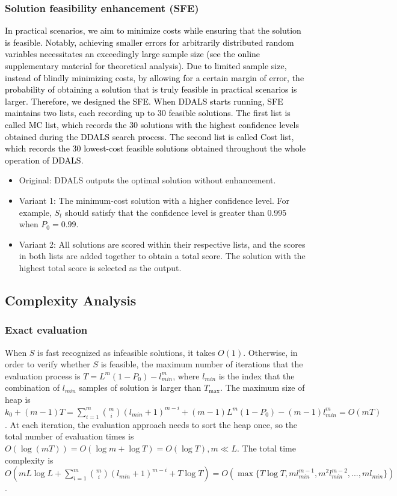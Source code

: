 \documentclass[lettersize,journal]{IEEEtran}
\begin{document}
\subsubsection{Solution feasibility enhancement (SFE)}
\textcolor{black}{
In practical scenarios, we aim to minimize costs while ensuring that the solution is feasible.
Notably, achieving smaller errors for arbitrarily distributed random variables necessitates an exceedingly large sample size (see the online supplementary material for theoretical analysis).
Due to limited sample size, instead of blindly minimizing costs, by allowing for a certain margin of error, the probability of obtaining a solution that is truly feasible in practical scenarios is larger. 
Therefore, we designed the SFE.
When DDALS starts running, SFE maintains two lists, each recording up to 30 feasible solutions.
The first list is called MC list, which records the 30 solutions with the highest confidence levels obtained during the DDALS search process. 
The second list is called Cost list, which records the 30 lowest-cost feasible solutions obtained throughout the whole operation of DDALS.
}
\begin{itemize}
    \item Original: DDALS outputs the optimal solution without enhancement. 
    \item Variant 1: The minimum-cost solution with a higher confidence level. For example, $S_t$ should satisfy that the confidence level is greater than 0.995 when $P_0 = 0.99$. 
    \item Variant 2: All solutions are scored within their respective lists, and the scores in both lists are added together to obtain a total score. 
    The solution with the highest total score is selected as the output.
\end{itemize}

\subsection{Complexity Analysis}

\subsubsection{Exact evaluation}
When $S$ is fast recognized as infeasible solutions, it takes $O(1)$. 
Otherwise, in order to verify whether $S$ is feasible, the maximum number of iterations that the evaluation process is $T=L^m (1-P_0)-l_{min}^m$, where $l_{min}$ is the index that the combination of $l_{min}$ samples of solution is larger than $T_{\max}$. 
The maximum size of heap is $k_0+(m-1)T=\sum_{i=1}^m \binom{m}{i} (l_{min}+1)^{m-i}+(m-1) L^m (1-P_0 ) -(m-1) l_ {min}^m=O(mT)$.
At each iteration, the evaluation approach needs to sort the heap once, so the total number of evaluation times is $O(\log(mT))=O(\log m+\log T)=O(\log T),m\ll L$.
The total time complexity is $O(mL\log L+\sum_{i=1}^m \binom{m}{i}(l_{min}+1)^{m-i}+ T\log T)= O(\max\{T\log T,ml_{min}^{m-1}, m^2 l_{min}^{m-2},...,ml_{min} \})$.
\end{document}
